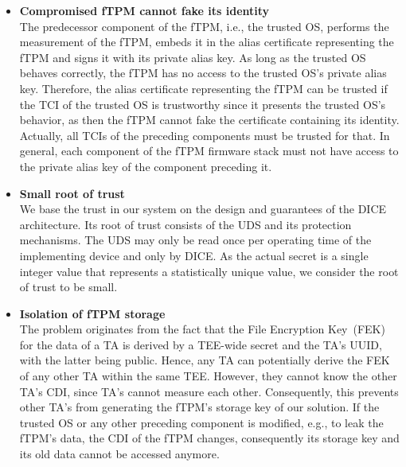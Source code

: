 \begin{itemize}
    \item{\textbf{Compromised fTPM cannot fake its identity}\\
    The predecessor component of the fTPM, i.e., the trusted OS, performs the measurement of the fTPM, embeds it in the alias certificate representing the fTPM and signs it with its private alias key.
    As long as the trusted OS behaves correctly, the fTPM has no access to the trusted OS's private alias key.
    Therefore, the alias certificate representing the fTPM can be trusted if the TCI of the trusted OS is trustworthy since it presents the trusted OS's behavior, as then the fTPM cannot fake the certificate containing its identity.
    Actually, all TCIs of the preceding components must be trusted for that.
    In general, each component of the fTPM firmware stack must not have access to the private alias key of the component preceding it.}

    \item{\textbf{Small root of trust}\\
    We base the trust in our system on the design and guarantees of the DICE architecture.
    Its root of trust consists of the \ac{UDS} and its protection mechanisms.
    The \ac{UDS} may only be read once per operating time of the implementing device and only by DICE\@.
    As the actual secret is a single integer value that represents a statistically unique value, we consider the root of trust to be small.}

    \item{\textbf{Isolation of fTPM storage}\\
    The problem originates from the fact that the File Encryption Key~(FEK) for the data of a TA is derived by a TEE-wide secret and the TA's UUID, with the latter being public.
    Hence, any TA can potentially derive the FEK of any other TA within the same TEE\@.
    However, they cannot know the other TA's CDI, since TA's cannot measure each other.
    Consequently, this prevents other TA's from generating the fTPM's storage key of our solution.
    If the trusted OS or any other preceding component is modified, e.g., to leak the fTPM's data, the CDI of the fTPM changes, consequently its storage key and its old data cannot be accessed anymore.}


\end{itemize}
